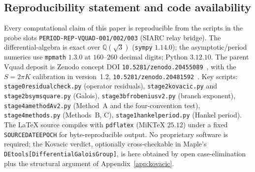 \documentclass[11pt,reqno]{amsart}
\renewcommand{\_}{\vquadorigunderscore\allowbreak}
\theoremstyle{plain}
\theoremstyle{definition}
\newcommand{\Qsqrt}{\mathbb{Q}(\sqrt3)}
\begin{document}
\subsection{Reproducibility statement and code availability}\label{app:repro}
Every computational claim of this paper is reproducible from the scripts in the probe slots
\texttt{PERIOD-REP-VQUAD-001/002/003} (SIARC relay bridge). The differential-algebra is exact over
$\Qsqrt$ (\texttt{sympy} $1.14.0$); the asymptotic/period numerics use \texttt{mpmath} $1.3.0$ at
$160$--$260$ decimal digits; Python $3.12.10$. The parent V\_quad deposit is Zenodo concept DOI
\texttt{10.5281/zenodo.20455089}~\cite{Vquad}, with the $S=2\pi K$ calibration in version~1.2,
\texttt{10.5281/zenodo.20481592}~\cite{StokesNote}. Key scripts:
\texttt{stage0\_residual\_check.py} (operator residuals), \texttt{stage2\_kovacic.py} and
\texttt{stage2b\_symsquare.py} (Galois), \texttt{stage3b\_frobenius\_v2.py} (branch exponent),
\texttt{stage4a\_methodA\_v2.py} (Method~A and the four-convention test),
\texttt{stage4\_methods.py} (Methods~B, C), \texttt{stage1\_hankel\_period.py} (Hankel period).
The LaTeX source compiles with \texttt{pdflatex} (MiKTeX $25.12$) under a fixed
\texttt{SOURCE\_DATE\_EPOCH} for byte-reproducible output. No proprietary software is required;
the Kovacic verdict, optionally cross-checkable in Maple's
\texttt{DEtools[DifferentialGaloisGroup]}, is here obtained by open case-elimination plus the
structural argument of Appendix~\ref{app:kovacic}.
\end{document}
